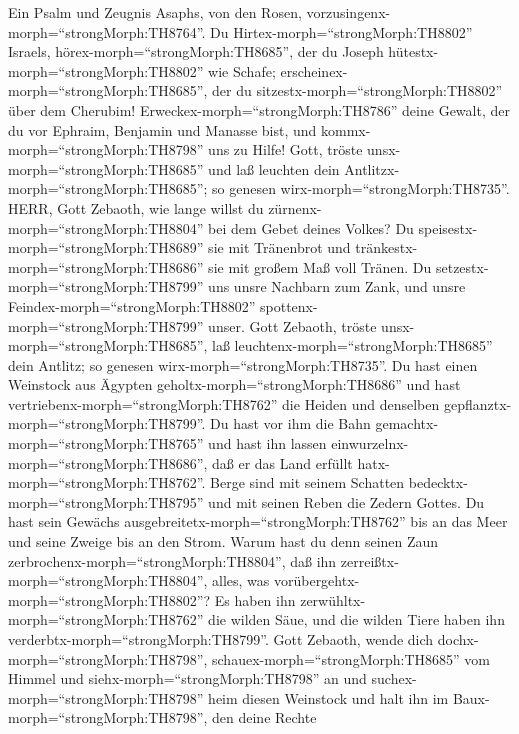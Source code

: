  Ein Psalm und Zeugnis Asaphs, von den Rosen,
vorzusingenx-morph=``strongMorph:TH8764''. Du
Hirtex-morph=``strongMorph:TH8802'' Israels,
hörex-morph=``strongMorph:TH8685'', der du Joseph
hütestx-morph=``strongMorph:TH8802'' wie Schafe;
erscheinex-morph=``strongMorph:TH8685'', der du
sitzestx-morph=``strongMorph:TH8802'' über dem Cherubim! 
Erweckex-morph=``strongMorph:TH8786'' deine Gewalt, der du vor Ephraim,
Benjamin und Manasse bist, und kommx-morph=``strongMorph:TH8798'' uns zu
Hilfe!  Gott, tröste unsx-morph=``strongMorph:TH8685'' und
laß leuchten dein Antlitzx-morph=``strongMorph:TH8685''; so genesen
wirx-morph=``strongMorph:TH8735''.  HERR, Gott Zebaoth, wie
lange willst du zürnenx-morph=``strongMorph:TH8804'' bei dem Gebet
deines Volkes?  Du speisestx-morph=``strongMorph:TH8689''
sie mit Tränenbrot und tränkestx-morph=``strongMorph:TH8686'' sie mit
großem Maß voll Tränen.  Du
setzestx-morph=``strongMorph:TH8799'' uns unsre Nachbarn zum Zank, und
unsre Feindex-morph=``strongMorph:TH8802''
spottenx-morph=``strongMorph:TH8799'' unser.  Gott Zebaoth,
tröste unsx-morph=``strongMorph:TH8685'', laß
leuchtenx-morph=``strongMorph:TH8685'' dein Antlitz; so genesen
wirx-morph=``strongMorph:TH8735''.  Du hast einen Weinstock
aus Ägypten geholtx-morph=``strongMorph:TH8686'' und hast
vertriebenx-morph=``strongMorph:TH8762'' die Heiden und denselben
gepflanztx-morph=``strongMorph:TH8799''.  Du hast vor ihm
die Bahn gemachtx-morph=``strongMorph:TH8765'' und hast ihn lassen
einwurzelnx-morph=``strongMorph:TH8686'', daß er das Land erfüllt
hatx-morph=``strongMorph:TH8762''.  Berge sind mit seinem
Schatten bedecktx-morph=``strongMorph:TH8795'' und mit seinen Reben die
Zedern Gottes.  Du hast sein Gewächs
ausgebreitetx-morph=``strongMorph:TH8762'' bis an das Meer und seine
Zweige bis an den Strom.  Warum hast du denn seinen Zaun
zerbrochenx-morph=``strongMorph:TH8804'', daß ihn
zerreißtx-morph=``strongMorph:TH8804'', alles, was
vorübergehtx-morph=``strongMorph:TH8802''?  Es haben ihn
zerwühltx-morph=``strongMorph:TH8762'' die wilden Säue, und die wilden
Tiere haben ihn verderbtx-morph=``strongMorph:TH8799''. 
Gott Zebaoth, wende dich dochx-morph=``strongMorph:TH8798'',
schauex-morph=``strongMorph:TH8685'' vom Himmel und
siehx-morph=``strongMorph:TH8798'' an und
suchex-morph=``strongMorph:TH8798'' heim diesen Weinstock 
und halt ihn im Baux-morph=``strongMorph:TH8798'', den deine Rechte
